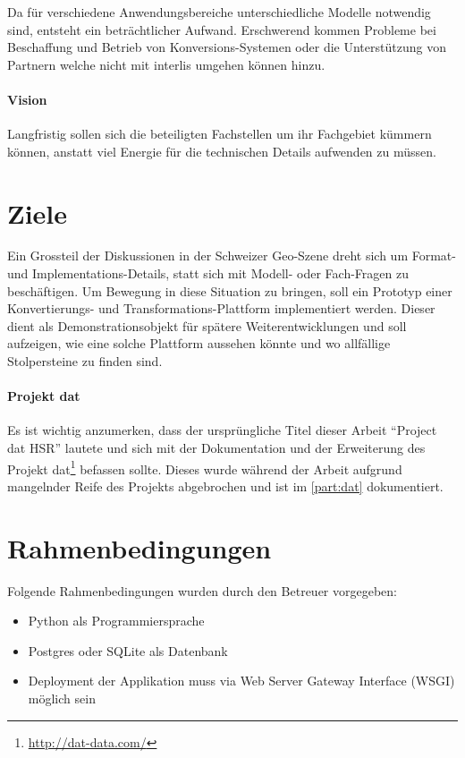 Da für verschiedene Anwendungsbereiche unterschiedliche Modelle notwendig sind, entsteht ein beträchtlicher Aufwand. Erschwerend kommen Probleme bei Beschaffung und Betrieb von Konversions-Systemen oder die Unterstützung von Partnern welche nicht mit \gls{interlis} umgehen können hinzu.

\paragraph{Vision}
Langfristig sollen sich die beteiligten Fachstellen um ihr Fachgebiet kümmern können, anstatt viel Energie für die technischen Details aufwenden zu müssen. 

\section{Ziele}
Ein Grossteil der Diskussionen in der Schweizer Geo-Szene dreht sich um Format- und Implementations-Details, statt sich mit Modell- oder Fach-Fragen zu beschäftigen. Um Bewegung in diese Situation zu bringen, soll ein Prototyp einer Konvertierungs- und Transformations-Plattform implementiert werden. Dieser dient als Demonstrationsobjekt für spätere Weiterentwicklungen und soll aufzeigen, wie eine solche Plattform aussehen könnte und wo allfällige Stolpersteine zu finden sind.

\paragraph{Projekt dat}
Es ist wichtig anzumerken, dass der ursprüngliche Titel dieser Arbeit ``Project dat HSR'' lautete und sich mit der Dokumentation und der Erweiterung des Projekt dat\footnote{\url{http://dat-data.com/}} befassen sollte. Dieses wurde während der Arbeit aufgrund mangelnder Reife des Projekts abgebrochen und ist im \vref{part:dat} dokumentiert.

\section{Rahmenbedingungen}

Folgende Rahmenbedingungen wurden durch den Betreuer\cite{sfkeller} vorgegeben:

\begin{itemize}
\item Python als Programmiersprache
\item Postgres oder SQLite als Datenbank
\item Deployment der Applikation muss via Web Server Gateway Interface (WSGI) möglich sein
\end{itemize}


